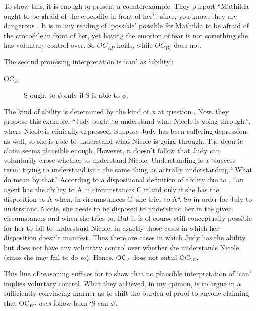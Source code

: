 \documentclass[12pt,numbers=noenddot]{scrartcl}
\begin{document}
 To show this, it is enough to present a counterexample. They purport “Mathilda ought to be afraid of the crocodile in front of her”, since, you know, they are dangerous \autocite[616]{Chuard2009-CHUENW}. It is in any reading of ‘possible’ possible for Mathilda to be afraid of the crocodile in front of her, yet having the emotion of fear is not something she has voluntary control over. So $OC_{AP}$ holds, while $OC_{VC}$ does not.

 The second promising interpretation is ‘can’ as ‘ability’:

 \begin{description}
    \item[OC$_{A}$] S ought to $\phi$ only if S is able to $\phi$.
 \end{description}

 The kind of ability is determined by the kind of $\phi$ at question \autocite[617]{Chuard2009-CHUENW}. Now, they propose this example: “Judy ought to understand what Nicole is going through.”, where Nicole is clinically depressed. Suppose Judy has been suffering depression as well, so she is able to understand what Nicole is going through. The deontic claim seems plausible enough. However, it doesn't follow that Judy can voluntarily chose whether to understand Nicole. Understanding is a “success term: trying to understand isn’t the same thing as actually understanding.“ What do \textcite[617]{Chuard2009-CHUENW} mean by that? According to a dispositional definition of ability due to \textcite[848]{Fara2008-FARMAA}, “an agent has the ability to A in circumstances C if and only if she has the disposition to A when, in circumstances C, she tries to A“. So in order for July to understand Nicole, she needs to be disposed to understand her in the given circumstances and when she tries to. But it is of course still conceptually possible for her to fail to understand Nicole, in exactly those cases in which her disposition doesn't manifest. Thus there are cases in which Judy has the ability, but does not have any voluntary control over whether she understands Nicole (since she may fail to do so). Hence, OC$_A$ does not entail OC$_{VC}$.

This line of reasoning suffices for \textcite[618]{Chuard2009-CHUENW} to show that no plausible interpretation of ‘can’ implies voluntary control. What they achieved, in my opinion, is to argue in a sufficiently convincing manner as to shift the burden of proof to anyone claiming that OC$_{VC}$ \emph{does} follow from ‘S can $\phi$’. 
\end{document}
